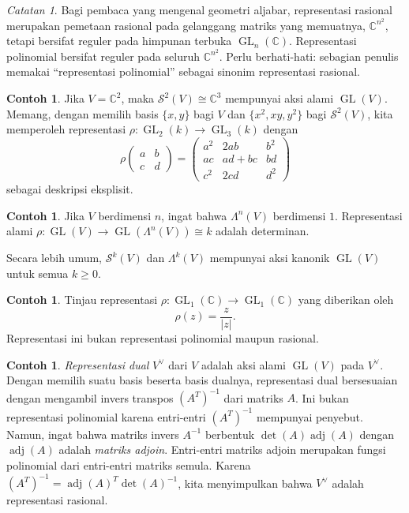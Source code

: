 \documentclass[12pt]{article}
\theoremstyle{plain}
\theoremstyle{definition}
\newtheorem{example}[theorem]{Contoh}
\theoremstyle{remark}
\newtheorem{remark}[theorem]{Catatan}
\numberwithin{equation}{section}
\begin{document}
\begin{remark}
Bagi pembaca yang mengenal geometri aljabar,
representasi rasional merupakan pemetaan rasional pada gelanggang matriks
yang memuatnya, $\mathbb{C}^{n^2}$, tetapi bersifat reguler pada himpunan terbuka
$\operatorname{GL}_n(\mathbb{C})$.
Representasi polinomial bersifat reguler pada seluruh
$\mathbb{C}^{n^2}$.
Perlu berhati-hati: sebagian penulis memakai ``representasi polinomial'' sebagai sinonim
representasi rasional.
\end{remark}

\begin{example}
Jika $V = \mathbb{C}^2$, maka $\mathcal{S}^2(V) \cong \mathbb{C}^3$
mempunyai aksi alami $\operatorname{GL}(V)$.
Memang, dengan memilih basis $\{x,y\}$ bagi $V$ dan $\{x^2,xy,y^2\}$
bagi $\mathcal{S}^2(V)$, kita memperoleh representasi
$\rho : \operatorname{GL}_2(k) \to \operatorname{GL}_3(k)$
dengan
\[
\rho
\begin{pmatrix} a & b \\ c & d \end{pmatrix}
=
\begin{pmatrix}
a^2 & 2ab & b^2\\
ac & ad+bc & bd\\
c^2 & 2cd & d^2
\end{pmatrix} 
\]
sebagai deskripsi eksplisit.
\end{example}

\begin{example}
Jika $V$ berdimensi $n$, ingat bahwa $\Lambda^n(V)$ berdimensi $1$.
Representasi alami
$\rho: \operatorname{GL}(V) \to \operatorname{GL}(\Lambda^n(V)) \cong k$
adalah determinan.
\end{example}

Secara lebih umum, $\mathcal{S}^k(V)$ dan $\Lambda^k(V)$
mempunyai aksi kanonik $\operatorname{GL}(V)$ untuk semua $k \ge 0$.

\begin{example}
Tinjau representasi
$\rho : \operatorname{GL}_1(\mathbb{C}) \to
\operatorname{GL}_1(\mathbb{C})$
yang diberikan oleh
\[
\rho(z) = \frac{z}{|z|} .
\]
Representasi ini bukan representasi polinomial maupun rasional.
\end{example}

\begin{example}
\emph{Representasi dual} $V^\vee$ dari $V$ adalah aksi alami
$\operatorname{GL}(V)$ pada $V^\vee$.
Dengan memilih suatu basis beserta basis dualnya,
representasi dual bersesuaian dengan mengambil invers transpos
$(A^T)^{-1}$
dari matriks $A$.
Ini bukan representasi polinomial karena entri-entri $(A^T)^{-1}$ mempunyai
penyebut.
Namun, ingat bahwa matriks invers $A^{-1}$ berbentuk
$\det(A)\operatorname{adj}(A)$ dengan
$\operatorname{adj}(A)$ adalah \emph{matriks adjoin}.
Entri-entri matriks adjoin merupakan fungsi polinomial dari
entri-entri matriks semula.
Karena $(A^T)^{-1}=\operatorname{adj}(A)^T \det(A)^{-1}$,
kita menyimpulkan bahwa $V^\vee$ adalah representasi rasional.
\end{example}
\end{document}
